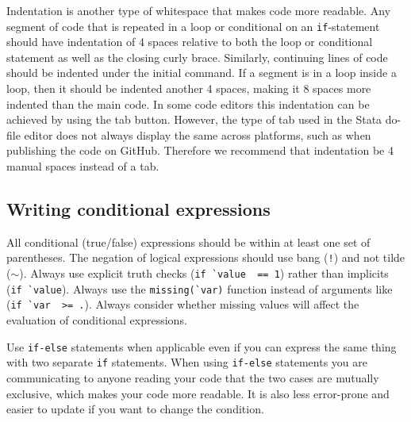 
\noindent Indentation is another type of whitespace that makes code more readable.
Any segment of code that is repeated in a loop or conditional on an
\texttt{if}-statement should have indentation of 4 spaces relative
to both the loop or conditional statement as well as the closing curly brace.
Similarly, continuing lines of code should be indented under the initial command.
If a segment is in a loop inside a loop, then it should be indented another 4 spaces,
making it 8 spaces more indented than the main code.
In some code editors this indentation can be achieved by using the tab button.
However, the type of tab used in the Stata do-file editor does not always display the same across platforms,
such as when publishing the code on GitHub.
Therefore we recommend that indentation be 4 manual spaces instead of a tab.


\subsection*{Writing conditional expressions}

All conditional (true/false) expressions should be within at least one set of parentheses.
The negation of logical expressions should use bang (\texttt{!}) and not tilde ($\sim$).
Always use explicit truth checks (\texttt{if \`{}value\textquotesingle\, == 1})
rather than implicits (\texttt{if \`{}value\textquotesingle}).
Always use the \texttt{missing(\`{}var\textquotesingle)} function
instead of arguments like (\texttt{if \`{}var\textquotesingle\, >= .}).
Always consider whether missing values will affect the evaluation of conditional expressions.


\noindent Use \texttt{if-else} statements when applicable
even if you can express the same thing with two separate \texttt{if} statements.
When using \texttt{if-else} statements you are communicating to anyone reading your code
that the two cases are mutually exclusive, which makes your code more readable.
It is also less error-prone and easier to update if you want to change the condition.


